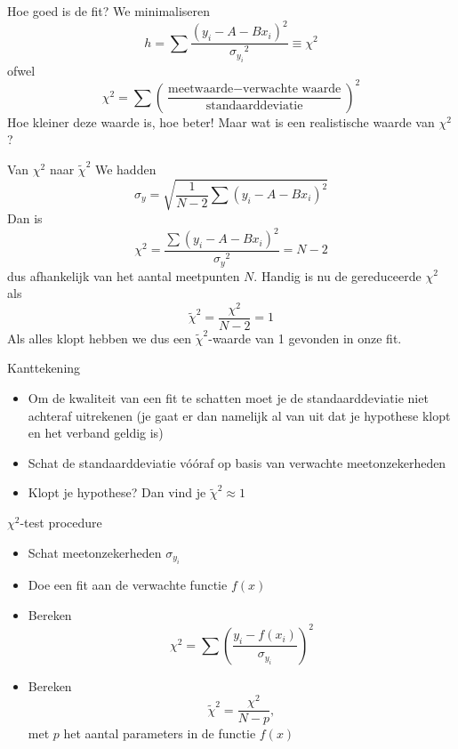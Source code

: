 \documentclass{beamer}
\newcommand{\rchisq}{\tilde\chi^2}
\begin{document}
\begin{frame}{Hoe goed is de fit?}
  We minimaliseren
  \begin{equation*}
    h = \sum\frac{(y_i - A - Bx_i)^2}{{\sigma_{y_i}}^2} \equiv \chi^2
  \end{equation*}
  ofwel
  \begin{equation*}
    \chi^2 = \sum\left(\frac{\text{meetwaarde} - \text{verwachte waarde}}{\text{standaarddeviatie}}\right)^2
  \end{equation*}
  Hoe kleiner deze waarde is, hoe beter! Maar wat is een realistische waarde van $\chi^2$?
\end{frame}

\begin{frame}{Van $\chi^2$ naar $\rchisq$}
  We hadden
  \begin{equation*}
    \sigma_y = \sqrt{\frac{1}{N-2}\sum(y_i - A - Bx_i)^2}
  \end{equation*}
  Dan is
  \begin{equation*}
    \chi^2 = \frac{\sum(y_i - A - Bx_i)^2}{{\sigma_y}^2} = N - 2
  \end{equation*}
  dus afhankelijk van het aantal meetpunten $N$. Handig is nu de \alert{gereduceerde $\chi^2$} als
  \begin{equation*}
    \rchisq = \frac{\chi^2}{N - 2} = 1
  \end{equation*}
  Als alles klopt hebben we dus een $\rchisq$-waarde van 1 gevonden in onze fit.
\end{frame}

\begin{frame}{Kanttekening}
  \begin{itemize}
    \item Om de kwaliteit van een fit te schatten moet je de standaarddeviatie niet achteraf uitrekenen (je gaat er dan namelijk al van uit dat je hypothese klopt en het verband geldig is)
    \pause
    \item Schat de standaarddeviatie vóóraf op basis van verwachte meetonzekerheden
    \pause
    \item Klopt je hypothese? Dan vind je $\rchisq \approx 1$
  \end{itemize}
\end{frame}

\begin{frame}{$\chi^2$-test procedure}
  \begin{itemize}
    \item Schat meetonzekerheden $\sigma_{y_i}$
    \item Doe een fit aan de verwachte functie $f(x)$
    \item Bereken
    \begin{equation*}
      \chi^2 = \sum\left(\frac{y_i - f(x_i)}{\sigma_{y_i}}\right)^2
    \end{equation*}
    \item Bereken
    \begin{equation*}
      \rchisq = \frac{\chi^2}{N - p},
    \end{equation*}
    met $p$ het aantal parameters in de functie $f(x)$
  \end{itemize}
\end{frame}
\end{document}
